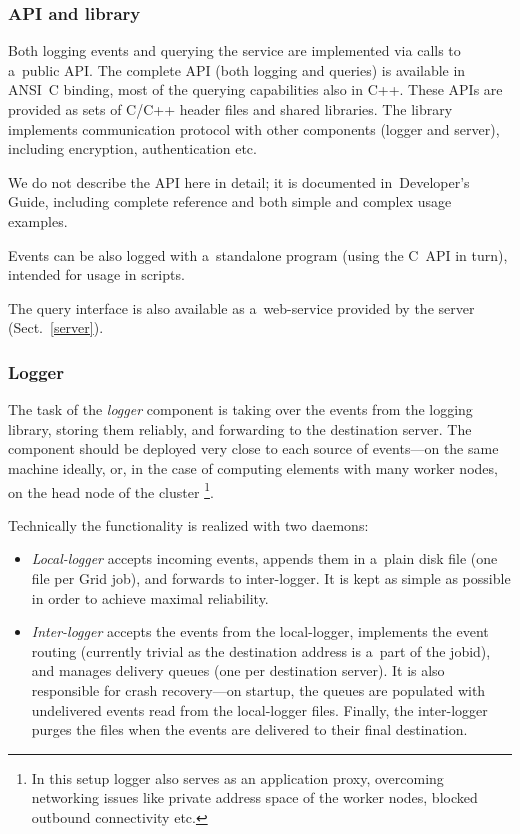 \subsubsection{\LB API and library}
Both logging events and querying the service are implemented via
calls to a~public \LB API.
The complete API (both logging and queries)
is available in ANSI~C binding, most of the querying capabilities also in C++.
These APIs are provided as sets of C/C++ header files and shared libraries.
The library implements communication protocol with other \LB components
(logger and server), including encryption, authentication etc.

We do not describe the API here in detail; it is documented in~\LB Developer's
Guide\cite{lbdg},
including complete reference and both simple and complex usage examples.

Events can be also logged with a~standalone program (using the C~API in turn),
intended for usage in scripts.

The query interface is also available as a~web-service provided by the
\LB server (Sect.~\ref{server}).

\subsubsection{Logger}
\label{comp:logger}
The task of the \emph{logger} component is taking over the events from
the logging library, storing them reliably, and forwarding to the destination
server.
The component should be deployed very close to each source of events---on the
same machine ideally, or, in the case of computing elements with many
worker nodes, on the head node of the cluster%
\footnote{In this setup logger also serves as an application proxy,
overcoming networking issues like private address space of the worker nodes,
blocked outbound connectivity etc.}.

Technically the functionality is realized with two daemons:
\begin{itemize}
\item \emph{Local-logger} accepts incoming events,
appends them in a~plain disk file (one file per Grid job),
and forwards to inter-logger.
It is kept as simple as possible in order to achieve
maximal reliability. 
\item \emph{Inter-logger} accepts the events from the local-logger,
implements the event routing (currently trivial as the destination
address is a~part of the jobid), and manages
delivery queues (one per destination server).
It is also responsible for crash recovery---on startup, the queues are
populated with undelivered events read from the local-logger files.
Finally, the inter-logger purges the files when the events are delivered to
their final destination.
\end{itemize}

